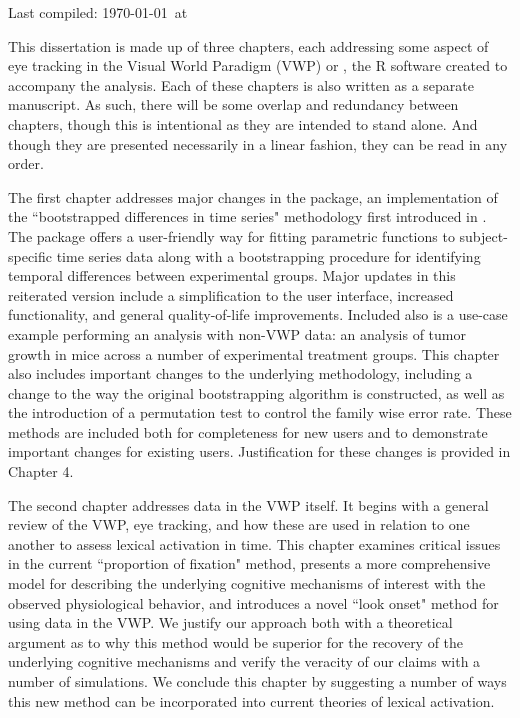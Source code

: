 
Last compiled: \today \  at \currenttime

This dissertation is made up of three chapters, each addressing some aspect of eye tracking in the Visual World Paradigm (VWP) or , the R software created to accompany the analysis. Each of these chapters is also written as a separate manuscript. As such, there will be some overlap and redundancy between chapters, though this is intentional as they are intended to stand alone. And though they are presented necessarily in a linear fashion, they can be read in any order.

The first chapter addresses major changes in the  package, an implementation of the ``bootstrapped differences in time series" methodology first introduced in \citet{oleson2017detecting}. The package offers a user-friendly way for fitting parametric functions to subject-specific time series data along with a bootstrapping procedure for identifying temporal differences between experimental groups. Major updates in this reiterated version include a simplification to the user interface, increased functionality, and general quality-of-life improvements. Included also is a use-case example performing an analysis with non-VWP data: an analysis of tumor growth in mice across a number of experimental treatment groups. This chapter also includes important changes to the underlying methodology, including a change to the way the original bootstrapping algorithm is constructed, as well as the introduction of a permutation test to control the family wise error rate. These methods are included both for completeness for new users and to demonstrate important changes for existing users. Justification for these changes is provided in Chapter 4. 

The second chapter addresses data in the VWP itself. It begins with a general review of the VWP, eye tracking, and how these are used in relation to one another to assess lexical activation in time. This chapter examines critical issues in the current ``proportion of fixation" method, presents a more comprehensive model for describing the underlying cognitive mechanisms of interest with the observed physiological behavior, and introduces a novel ``look onset" method for using data in the VWP. We justify our approach both with a theoretical argument as to why this method would be superior for the recovery of the underlying cognitive mechanisms and verify the veracity of our claims with a number of simulations. We conclude this chapter by suggesting a number of ways this new method can be incorporated into current theories of lexical activation.

